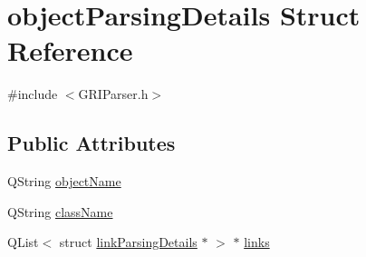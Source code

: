 \hypertarget{structobjectParsingDetails}{\section{object\-Parsing\-Details \-Struct \-Reference}
\label{structobjectParsingDetails}
}


{\ttfamily \#include $<$\-G\-R\-I\-Parser.\-h$>$}

\subsection*{\-Public \-Attributes}
\begin{DoxyCompactItemize}
\item 
\-Q\-String \hyperlink{structobjectParsingDetails_aa6dcb31a8662af48c35bc5ef7da04e93}{object\-Name}
\item 
\-Q\-String \hyperlink{structobjectParsingDetails_a41b32c25562ba5deaca6c9d5f3f3b7c9}{class\-Name}
\item 
\-Q\-List$<$ struct \*
\hyperlink{structlinkParsingDetails}{link\-Parsing\-Details} $\ast$ $>$ $\ast$ \hyperlink{structobjectParsingDetails_ab05542f10e1957514ed831b03efb4ef5}{links}
\end{DoxyCompactItemize}


